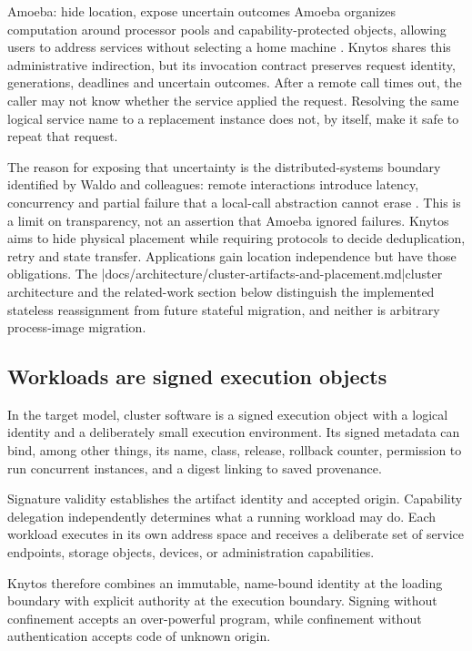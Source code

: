 \begin{architecturalcomparison}{Amoeba: hide location, expose uncertain outcomes}
Amoeba organizes computation around processor pools and capability-protected
objects, allowing users to address services without selecting a home machine
\cite{prior:amoeba}. Knytos shares this administrative indirection, but
its invocation contract preserves request identity, generations, deadlines
and uncertain outcomes. After a remote call times out, the caller may not know
whether the service applied the request. Resolving the same logical service
name to a replacement instance does not, by itself, make it safe to repeat
that request.

The reason for exposing that uncertainty is the distributed-systems boundary
identified by Waldo and colleagues: remote interactions introduce latency,
concurrency and partial failure that a local-call abstraction cannot erase
\cite{prior:distributed-note}. This is a limit on transparency, not an
assertion that Amoeba ignored failures. Knytos aims to hide physical
placement while requiring protocols to decide deduplication, retry and state
transfer. Applications gain location independence but have those obligations.
The \repofiletext|docs/architecture/cluster-artifacts-and-placement.md|{cluster
architecture} and the related-work section below distinguish the implemented
stateless reassignment from future stateful migration, and neither is arbitrary
process-image migration.
\end{architecturalcomparison}

\subsection{Workloads are signed execution objects}

In the target model, cluster software is a signed execution object with a
logical identity and a deliberately small execution environment. Its signed
metadata can bind, among other things, its name, class, release, rollback
counter, permission to run concurrent instances, and a digest linking to
saved provenance.

Signature validity establishes the artifact identity and accepted origin.
Capability delegation independently determines what a running workload may
do. Each workload executes in its own address space and receives a deliberate
set of service endpoints, storage objects, devices, or administration
capabilities.

Knytos therefore combines an immutable, name-bound identity at the
loading boundary with explicit authority at the execution boundary. Signing
without confinement accepts an over-powerful program, while confinement without
authentication accepts code of unknown origin.

